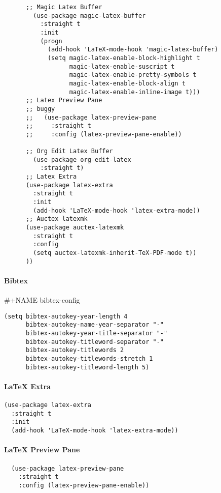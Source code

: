 \documentclass[11pt]{article}
\begin{document}
\begin{verbatim}
      ;; Magic Latex Buffer
        (use-package magic-latex-buffer
          :straight t
          :init
          (progn
            (add-hook 'LaTeX-mode-hook 'magic-latex-buffer)
            (setq magic-latex-enable-block-highlight t
                  magic-latex-enable-suscript t
                  magic-latex-enable-pretty-symbols t
                  magic-latex-enable-block-align t
                  magic-latex-enable-inline-image t)))
      ;; Latex Preview Pane
      ;; buggy
      ;;   (use-package latex-preview-pane
      ;;     :straight t
      ;;     :config (latex-preview-pane-enable))

      ;; Org Edit Latex Buffer
        (use-package org-edit-latex
          :straight t)
      ;; Latex Extra
      (use-package latex-extra
        :straight t
        :init
        (add-hook 'LaTeX-mode-hook 'latex-extra-mode))
      ;; Auctex latexmk
      (use-package auctex-latexmk
        :straight t
        :config
        (setq auctex-latexmk-inherit-TeX-PDF-mode t))
      ))
\end{verbatim}

\paragraph*{Bibtex}
\label{sec:org631b0d7}

\#+NAME bibtex-config
\begin{verbatim}
(setq bibtex-autokey-year-length 4
      bibtex-autokey-name-year-separator "-"
      bibtex-autokey-year-title-separator "-"
      bibtex-autokey-titleword-separator "-"
      bibtex-autokey-titlewords 2
      bibtex-autokey-titlewords-stretch 1
      bibtex-autokey-titleword-length 5)
\end{verbatim}

\paragraph*{\LaTeX{} Extra}
\label{sec:org994070f}

\begin{verbatim}
(use-package latex-extra
  :straight t
  :init
  (add-hook 'LaTeX-mode-hook 'latex-extra-mode))
\end{verbatim}

\paragraph*{\LaTeX{} Preview Pane}
\label{sec:org4b49acd}

\begin{verbatim}
  (use-package latex-preview-pane
    :straight t
    :config (latex-preview-pane-enable))
\end{verbatim}
\end{document}
